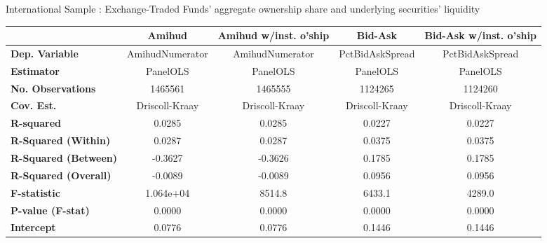 \begin{center}
    \caption{International Sample : Exchange-Traded Funds' aggregate ownership share and underlying securities' liquidity}
    \label{tab:Liquidity:Intl:Comp}
  \begin{tabular}{lcccc}
    \toprule
    &   \textbf{Amihud}   & \textbf{Amihud w/inst. o'ship} &   \textbf{Bid-Ask}  & \textbf{Bid-Ask w/inst. o'ship}  \\
    \midrule
    \textbf{Dep. Variable}                     &   AmihudNumerator   &        AmihudNumerator         &   PctBidAskSpread   &         PctBidAskSpread          \\
    \textbf{Estimator}                         &       PanelOLS      &            PanelOLS            &       PanelOLS      &             PanelOLS             \\
    \textbf{No. Observations}                  &       1465561       &            1465555             &       1124265       &             1124260              \\
    \textbf{Cov. Est.}                         &    Driscoll-Kraay   &         Driscoll-Kraay         &    Driscoll-Kraay   &          Driscoll-Kraay          \\
    \textbf{R-squared}                         &        0.0285       &             0.0285             &        0.0227       &              0.0227              \\
    \textbf{R-Squared (Within)}                &        0.0287       &             0.0287             &        0.0375       &              0.0375              \\
    \textbf{R-Squared (Between)}               &       -0.3627       &            -0.3626             &        0.1785       &              0.1785              \\
    \textbf{R-Squared (Overall)}               &       -0.0089       &            -0.0089             &        0.0956       &              0.0956              \\
    \textbf{F-statistic}                       &      1.064e+04      &             8514.8             &        6433.1       &              4289.0              \\
    \textbf{P-value (F-stat)}                  &        0.0000       &             0.0000             &        0.0000       &              0.0000              \\
    \midrule
    \textbf{Intercept}                         &        0.0776       &             0.0776             &        0.1446       &              0.1446              \\

\end{tabular}
\end{center}
